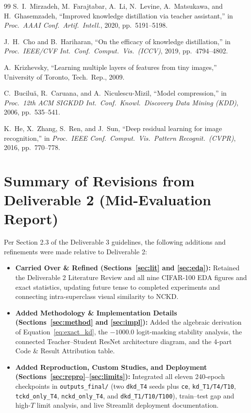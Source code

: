 \documentclass[11pt]{article}
\begin{document}
\begin{thebibliography}{99}
S.~I.~Mirzadeh, M.~Farajtabar, A.~Li, N.~Levine, A.~Matsukawa, and H.~Ghasemzadeh, ``Improved knowledge distillation via teacher assistant,'' in \emph{Proc.\ AAAI Conf.\ Artif.\ Intell.}, 2020, pp.\ 5191--5198.

J.~H.~Cho and B.~Hariharan, ``On the efficacy of knowledge distillation,'' in \emph{Proc.\ IEEE/CVF Int.\ Conf.\ Comput.\ Vis.\ (ICCV)}, 2019, pp.\ 4794--4802.

A.~Krizhevsky, ``Learning multiple layers of features from tiny images,'' University of Toronto, Tech.\ Rep., 2009.

C.~Bucilu\u{a}, R.~Caruana, and A.~Niculescu-Mizil, ``Model compression,'' in \emph{Proc.\ 12th ACM SIGKDD Int.\ Conf.\ Knowl.\ Discovery Data Mining (KDD)}, 2006, pp.\ 535--541.

K.~He, X.~Zhang, S.~Ren, and J.~Sun, ``Deep residual learning for image recognition,'' in \emph{Proc.\ IEEE Conf.\ Comput.\ Vis.\ Pattern Recognit.\ (CVPR)}, 2016, pp.\ 770--778.

\end{thebibliography}
\endgroup

\appendix
\section{Summary of Revisions from Deliverable 2 (Mid-Evaluation Report)}
\label{app:revisions}

Per Section 2.3 of the Deliverable 3 guidelines, the following additions and refinements were made relative to Deliverable 2:
\begin{itemize}
    \item \textbf{Carried Over \& Refined (Sections~\ref{sec:lit} and \ref{sec:eda}):} Retained the Deliverable 2 Literature Review and all nine CIFAR-100 EDA figures and exact statistics, updating future tense to completed experiments and connecting intra-superclass visual similarity to \(\mathrm{NCKD}\).
    \item \textbf{Added Methodology \& Implementation Details (Sections~\ref{sec:method} and \ref{sec:impl}):} Added the algebraic derivation of Equation~\eqref{eq:exact_kd}, the \(-1000.0\) logit-masking stability analysis, the connected Teacher--Student ResNet architecture diagram, and the 4-part Code \& Result Attribution table.
    \item \textbf{Added Reproduction, Custom Studies, and Deployment (Sections~\ref{sec:repro}--\ref{sec:limits}):} Integrated all eleven 240-epoch checkpoints in \texttt{outputs\_final/} (two \texttt{dkd\_T4} seeds plus \texttt{ce}, \texttt{kd\_T1/T4/T10}, \texttt{tckd\_only\_T4}, \texttt{nckd\_only\_T4}, and \texttt{dkd\_T1/T10/T100}), train--test gap and high-\(T\) limit analysis, and live Streamlit deployment documentation.
\end{itemize}
\end{document}
